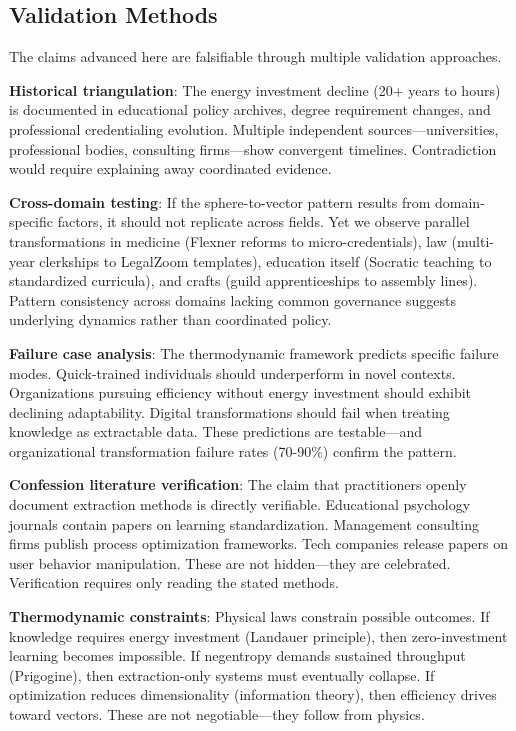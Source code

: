\subsection{Validation Methods}

The claims advanced here are falsifiable through multiple validation approaches.

\textbf{Historical triangulation}: The energy investment decline (20+ years to hours) is documented in educational policy archives, degree requirement changes, and professional credentialing evolution. Multiple independent sources---universities, professional bodies, consulting firms---show convergent timelines. Contradiction would require explaining away coordinated evidence.

\textbf{Cross-domain testing}: If the sphere-to-vector pattern results from domain-specific factors, it should not replicate across fields. Yet we observe parallel transformations in medicine (Flexner reforms to micro-credentials), law (multi-year clerkships to LegalZoom templates), education itself (Socratic teaching to standardized curricula), and crafts (guild apprenticeships to assembly lines). Pattern consistency across domains lacking common governance suggests underlying dynamics rather than coordinated policy.

\textbf{Failure case analysis}: The thermodynamic framework predicts specific failure modes. Quick-trained individuals should underperform in novel contexts. Organizations pursuing efficiency without energy investment should exhibit declining adaptability. Digital transformations should fail when treating knowledge as extractable data. These predictions are testable---and organizational transformation failure rates (70-90\%) confirm the pattern.

\textbf{Confession literature verification}: The claim that practitioners openly document extraction methods is directly verifiable. Educational psychology journals contain papers on learning standardization. Management consulting firms publish process optimization frameworks. Tech companies release papers on user behavior manipulation. These are not hidden---they are celebrated. Verification requires only reading the stated methods.

\textbf{Thermodynamic constraints}: Physical laws constrain possible outcomes. If knowledge requires energy investment (Landauer principle), then zero-investment learning becomes impossible. If negentropy demands sustained throughput (Prigogine), then extraction-only systems must eventually collapse. If optimization reduces dimensionality (information theory), then efficiency drives toward vectors. These are not negotiable---they follow from physics.

